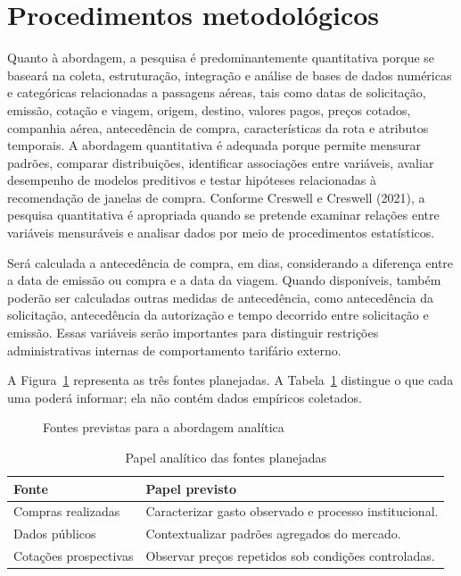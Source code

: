 \section{Procedimentos metodológicos}

Quanto à abordagem, a pesquisa é predominantemente quantitativa porque se baseará na coleta, estruturação, integração e análise de bases de dados numéricas e categóricas relacionadas a passagens aéreas, tais como datas de solicitação, emissão, cotação e viagem, origem, destino, valores pagos, preços cotados, companhia aérea, antecedência de compra, características da rota e atributos temporais. A abordagem quantitativa é adequada porque permite mensurar padrões, comparar distribuições, identificar associações entre variáveis, avaliar desempenho de modelos preditivos e testar hipóteses relacionadas à recomendação de janelas de compra. Conforme Creswell e Creswell (2021), a pesquisa quantitativa é apropriada quando se pretende examinar relações entre variáveis mensuráveis e analisar dados por meio de procedimentos estatísticos.

Será calculada a antecedência de compra, em dias, considerando a diferença entre a data de emissão ou compra e a data da viagem. Quando disponíveis, também poderão ser calculadas outras medidas de antecedência, como antecedência da solicitação, antecedência da autorização e tempo decorrido entre solicitação e emissão. Essas variáveis serão importantes para distinguir restrições administrativas internas de comportamento tarifário externo.

A Figura~\ref{fig:fluxo-fontes} representa as três fontes planejadas. A Tabela~\ref{tab:fontes-planejadas} distingue o que cada uma poderá informar; ela não contém dados empíricos coletados.

\begin{figure}[htb]
\caption{Fontes previstas para a abordagem analítica}
\label{fig:fluxo-fontes}
\centering
{}
\end{figure}

\begin{table}[htb]
\caption{Papel analítico das fontes planejadas}
\label{tab:fontes-planejadas}
\centering
\begin{tabular}{p{}p{}}
\hline
Fonte & Papel previsto \\
\hline
Compras realizadas & Caracterizar gasto observado e processo institucional. \\
Dados públicos & Contextualizar padrões agregados do mercado. \\
Cotações prospectivas & Observar preços repetidos sob condições controladas. \\
\hline
\end{tabular}
\end{table}

